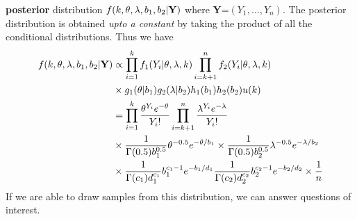 \documentclass[11pt]{article}
\begin{document}
{\bf posterior} distribution $f(k,\theta,\lambda,b_1,b_2| {\bf Y})$ where
{\bf Y}=$(Y_1,\dots,Y_n)$. The posterior distribution is obtained {\it upto a constant} by
taking the product of all the conditional distributions. Thus we have
\begin{equation*}
\begin{split}
f(k,\theta,\lambda,b_1,b_2| {\bf Y}) & \propto \prod_{i=1}^k f_1(Y_i|\theta,\lambda,k) \prod_{i=k+1}^n f_2(Y_i|\theta,\lambda,k)\\
& \times g_1(\theta|b_1) g_2(\lambda|b_2) h_1(b_1) h_2(b_2) u(k)\\
& = \prod_{i=1}^k \frac{\theta^{Y_i} e^{-\theta}}{Y_i !} \prod_{i=k+1}^n \frac{\lambda^{Y_i} e^{-\lambda}}{Y_i !} \\
& \times  \frac{1}{\Gamma(0.5)b_1^{0.5}} \theta^{-0.5} e^{-\theta/b_1} \times \frac{1}{\Gamma(0.5)b_2^{0.5}} \lambda^{-0.5} e^{-\lambda/b_2}\\ 
& \times \frac{1}{\Gamma(c_1) d_1^{c_1}} b_1^{c_1-1} e^{-b_1/d_1}  \frac{1}{\Gamma(c_2) d_2^{c_2}} b_2^{c_2-1} e^{-b_2/d_2} \times \frac{1}{n}
\end{split}
\end{equation*}
If we are able to draw samples from this distribution, we can answer
questions of interest. %
\end{document}
